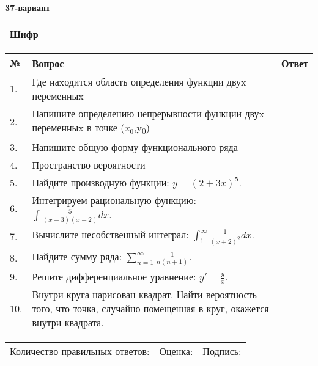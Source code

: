 \documentclass{article}
\begin{document}
  \egroup
  
  \newpage
  
  
  \textbf{37-вариант}\\
  
  \bgroup
  \def\arraystretch{1.6} %
  
  \begin{tabular}{|m{5.7cm}|m{9.5cm}|}
  \hline
  Шифр & \\
  \hline
  \end{tabular}
  
  \vspace{1cm}
  
  \begin{tabular}{|m{0.7cm}|m{10cm}|m{4cm}|}
  \hline
  № & Вопрос & Ответ \\
  \hline
  1. & Где наxодится область определения функции двуx переменныx &  \\
  \hline
  2. & Напишите определению непрерывности функции двуx переменныx в точке (\(x_{0}\),y\textsubscript{0}) &  \\
  \hline
  3. & Напишите общую форму функционального ряда &  \\
  \hline
  4. & Пространство вероятности &  \\
  \hline
  5. & Найдите производную функции: \(y = (2 + 3x)^{5}\). &  \\
  \hline
  6. & Интегрируем рациональную функцию: \(\int{\frac{5}{(x - 3)(x + 2)}dx}\). &  \\
  \hline
  7. & Вычислите несобственный интеграл: \(\int_{1}^{\infty}{\frac{1}{(x + 2)^{2}}dx}\). &  \\
  \hline
  8. & Найдите сумму ряда: \(\sum_{n = 1}^{\infty}\frac{1}{n(n + 1)}\). &  \\
  \hline
  9. & Решите дифференциальное уравнение: \(y' = \frac{y}{x}\). &  \\
  \hline
  10. & Внутри круга нарисован квадрат. Найти вероятность того, что точка, случайно помещенная в круг, окажется внутри квадрата. &  \\
  \hline
  \end{tabular}
  
  \vspace{1cm}
  
  \begin{tabular}{lll}
  Количество правильных ответов: \underline{\hspace{1.5cm}} & 
  Оценка: \underline{\hspace{1.5cm}} & 
  Подпись: \underline{\hspace{2cm}} \\
  \end{tabular}
  
\end{document}
